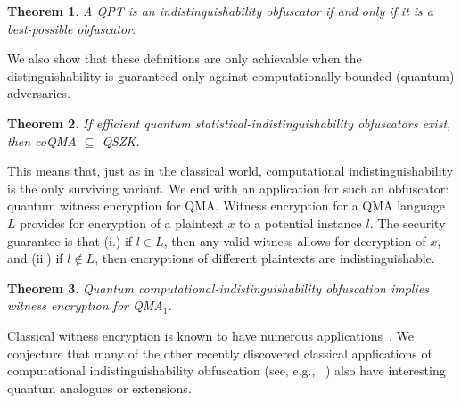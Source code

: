 \documentclass[11pt]{amsart}
\numberwithin{equation}{section}
\newtheorem{theorem}{Theorem}
\begin{document}
\begin{theorem}
A QPT is an indistinguishability obfuscator if and only if it is a best-possible obfuscator.
\end{theorem}

\noindent We also show that these definitions are only achievable when the distinguishability is guaranteed only against computationally bounded (quantum) adversaries.

\begin{theorem}
If efficient quantum statistical-indistinguishability obfuscators exist, then coQMA $\subseteq$ QSZK.
\end{theorem}

This means that, just as in the classical world, computational indistinguishability is the only surviving variant. We end with an application for such an obfuscator: quantum witness encryption for QMA. Witness encryption for a QMA language $L$ provides for encryption of a plaintext $x$ to a potential instance $l$. The security guarantee is that (i.) if $l \in L$, then any valid witness allows for decryption of $x$, and (ii.) if $l \notin L$, then encryptions of different plaintexts are indistinguishable. 

\begin{theorem}
Quantum computational-indistinguishability obfuscation implies witness encryption for QMA$_1$.
\end{theorem}

\noindent Classical witness encryption is known to have numerous applications~\cite{GGSW13}. We conjecture that many of the other recently discovered classical applications of computational indistinguishability obfuscation (see, e.g., ~\cite{SW14}) also have interesting quantum analogues or extensions.



\end{document}
